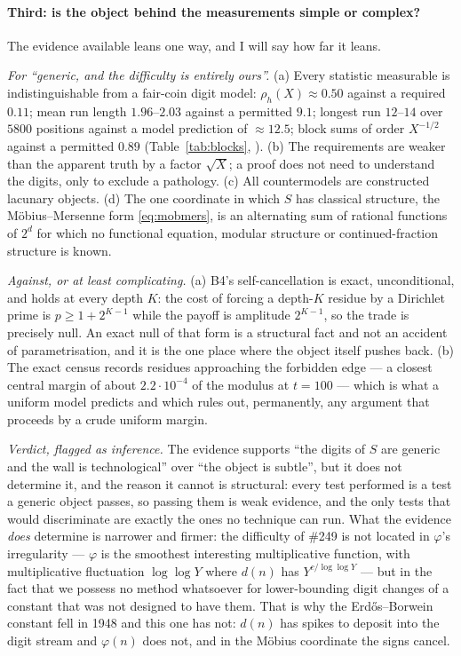 \paragraph{Third: is the object behind the measurements simple or complex?}
The evidence available leans one way, and I will say how far it leans.

\emph{For ``generic, and the difficulty is entirely ours''.} (a) Every
statistic measurable is indistinguishable from a fair-coin digit model:
$\rho_h(X)\approx0.50$ against a required $0.11$; mean run length
$1.96$--$2.03$ against a permitted $9.1$; longest run $12$--$14$ over $5800$
positions against a model prediction of $\approx12.5$; block sums of order
$X^{-1/2}$ against a permitted $0.89$ (Table~\ref{tab:blocks}, ). (b) The
requirements are weaker than the apparent truth by a factor $\sqrt X$; a
proof does not need to understand the digits, only to exclude a pathology.
(c) All countermodels are constructed lacunary objects. (d) The one
coordinate in which $S$ has classical structure, the M\"obius--Mersenne
form \eqref{eq:mobmers}, is an alternating sum of rational functions of
$2^{d}$ for which no functional equation, modular structure or
continued-fraction structure is known.

\emph{Against, or at least complicating.} (a) B4's self-cancellation is
exact, unconditional, and holds at every depth $K$: the cost of forcing a
depth-$K$ residue by a Dirichlet prime is $p\ge1+2^{K-1}$ while the payoff is
amplitude $2^{K-1}$, so the trade is precisely null. An exact null of that
form is a structural fact and not an accident of parametrisation, and it is
the one place where the object itself pushes back. (b) The exact census
records residues approaching the forbidden edge --- a closest central margin
of about $2.2\cdot10^{-4}$ of the modulus at $t=100$ --- which is what a
uniform model predicts and which rules out, permanently, any argument that
proceeds by a crude uniform margin.

\emph{Verdict, flagged as inference.} The evidence supports ``the digits of
$S$ are generic and the wall is technological'' over ``the object is
subtle'', but it does not determine it, and the reason it cannot is
structural: every test performed is a test a generic object passes, so
passing them is weak evidence, and the only tests that would discriminate are
exactly the ones no technique can run. What the evidence \emph{does} determine
is narrower and firmer: the difficulty of \#249 is not located in $\varphi$'s
irregularity --- $\varphi$ is the smoothest interesting multiplicative
function, with multiplicative fluctuation $\log\log Y$ where $d(n)$ has
$Y^{c/\log\log Y}$ --- but in the fact that we possess no method whatsoever
for lower-bounding digit changes of a constant that was not designed to have
them. That is why the Erd\H{o}s--Borwein constant fell in 1948 and this one
has not: $d(n)$ has spikes to deposit into the digit stream and $\varphi(n)$
does not, and in the M\"obius coordinate the signs cancel.

